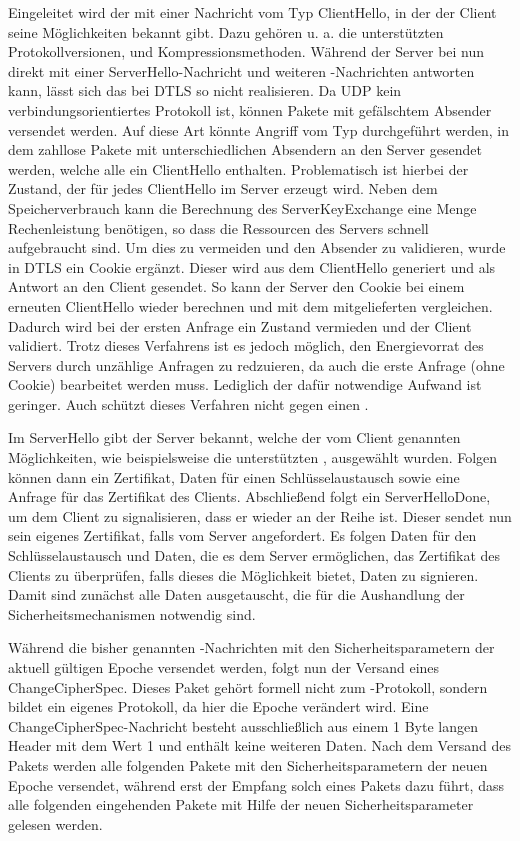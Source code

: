 Eingeleitet wird der  mit einer Nachricht vom Typ ClientHello, in der der Client seine Möglichkeiten bekannt gibt. Dazu gehören u. a. die unterstützten
Protokollversionen,  und Kompressionsmethoden. Während der Server bei  nun direkt mit einer ServerHello-Nachricht und weiteren
-Nachrichten antworten kann, lässt sich das bei DTLS so nicht realisieren. Da UDP kein verbindungsorientiertes Protokoll ist, können Pakete mit gefälschtem
Absender versendet werden. Auf diese Art könnte Angriff vom Typ  durchgeführt werden, in dem zahllose Pakete mit unterschiedlichen Absendern an den Server
gesendet werden, welche alle ein ClientHello enthalten. Problematisch ist hierbei der Zustand, der für jedes ClientHello im Server erzeugt wird. Neben dem
Speicherverbrauch kann die Berechnung des ServerKeyExchange eine Menge Rechenleistung benötigen, so dass die Ressourcen des Servers schnell aufgebraucht sind.
Um dies zu vermeiden und den Absender zu validieren, wurde in DTLS ein Cookie ergänzt. Dieser wird aus dem ClientHello generiert und als Antwort an den Client
gesendet. So kann der Server den Cookie bei einem erneuten ClientHello wieder berechnen und mit dem mitgelieferten vergleichen. Dadurch wird bei der ersten Anfrage
ein Zustand vermieden und der Client validiert. Trotz dieses Verfahrens ist es jedoch möglich, den Energievorrat des Servers durch unzählige Anfragen zu redzuieren,
da auch die erste Anfrage (ohne Cookie) bearbeitet werden muss. Lediglich der dafür notwendige Aufwand ist geringer. Auch schützt dieses Verfahren nicht gegen
einen .

Im ServerHello gibt der Server bekannt, welche der vom Client genannten Möglichkeiten, wie beispielsweise die unterstützten , ausgewählt wurden.
Folgen können dann ein Zertifikat, Daten für einen Schlüsselaustausch sowie eine Anfrage für das Zertifikat des Clients. Abschließend folgt ein ServerHelloDone, um
dem Client zu signalisieren, dass er wieder an der Reihe ist. Dieser sendet nun sein eigenes Zertifikat, falls vom Server angefordert. Es folgen Daten für den
Schlüsselaustausch und Daten, die es dem Server ermöglichen, das Zertifikat des Clients zu überprüfen, falls dieses die Möglichkeit bietet, Daten zu signieren.
Damit sind zunächst alle Daten ausgetauscht, die für die Aushandlung der Sicherheitsmechanismen notwendig sind.

Während die bisher genannten -Nachrichten mit den Sicherheitsparametern der aktuell gültigen Epoche versendet werden, folgt nun der Versand eines
ChangeCipherSpec. Dieses Paket gehört formell nicht zum -Protokoll, sondern bildet ein eigenes Protokoll, da hier die Epoche verändert wird.
Eine ChangeCipherSpec-Nachricht besteht ausschließlich aus einem 1 Byte langen Header mit dem Wert 1 und enthält keine weiteren Daten.
Nach dem Versand des Pakets werden alle folgenden Pakete mit den Sicherheitsparametern der neuen Epoche versendet, während erst der Empfang solch eines
Pakets dazu führt, dass alle folgenden eingehenden Pakete mit Hilfe der neuen Sicherheitsparameter gelesen werden.

